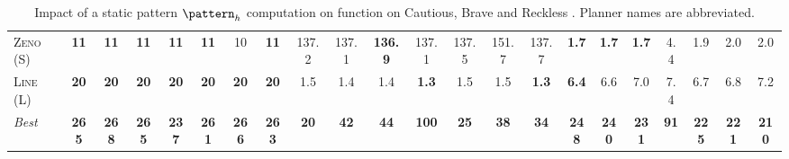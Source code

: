 \begin{table}[tb]
{\begin{tabular}{|l||ccccccc||ccccccc||ccccccc||}
\textsc{Zeno} (S)&\textbf{11}&\textbf{11}&\textbf{11}&\textbf{11}&\textbf{11}&10&\textbf{11}&137.2&137.1&\textbf{136.9}&137.1&137.5&151.7&137.7&\textbf{1.7}&\textbf{1.7}&\textbf{1.7}&4.4&1.9&2.0&2.0\\
\textsc{Line} (L)&\textbf{20}&\textbf{20}&\textbf{20}&\textbf{20}&\textbf{20}&\textbf{20}&\textbf{20}&1.5&1.4&1.4&\textbf{1.3}&1.5&1.5&\textbf{1.3}&\textbf{6.4}&6.6&7.0&7.4&6.7&6.8&7.2
\\\hline
\textit{Best}&\textbf{265}&\textbf{268}&\textbf{265}&\textbf{237}&\textbf{261}&\textbf{266}&\textbf{263}&\textbf{20}&\textbf{42}&\textbf{44}&\textbf{100}&\textbf{25}&\textbf{38}&\textbf{34}&\textbf{248}&\textbf{240}&\textbf{231}&\textbf{91}&\textbf{225}&\textbf{221}&\textbf{210}\\\hline

        \end{tabular}}
        \caption{Impact of a static pattern $\pattern_h$ computation on function on Cautious, Brave and Reckless \pattyd. Planner names are abbreviated.}
        \label{tab:abl-patternh-static}
        \end{table}
        